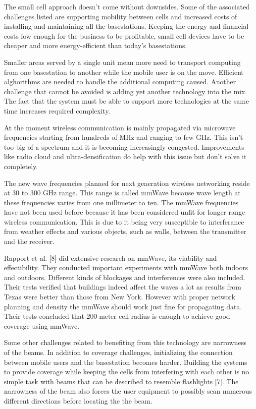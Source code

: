 \documentclass[conference]{IEEEtran}
\begin{document}
\par
The small cell approach doesn't come without downsides. Some of the associated challenges listed are supporting mobility between cells and increased costs of installing and maintaining all the basestations. Keeping the energy and financial costs low enough for the business to be profitable, small cell devices have to be cheaper and more energy-efficient than today's basestations.
\par
Smaller areas served by a single unit mean more need to transport computing from one basestation to another while the mobile user is on the move. Efficient alghorithms are needed to handle the additional computing caused. Another challenge that cannot be avoided is adding yet another technology into the mix. The fact that the system must be able to support more technologies at the same time increases required complexity.
\par
At the moment wireless communication is mainly propagated via microwave frequencies starting from hundreds of MHz and ranging to few GHz. This isn't too big of a spectrum and it is becoming increasingly congested. Improvements like radio cloud and ultra-densification do help with this issue but don't solve it completely.
\par
The new wave frequencies planned for next generation wireless networking reside at 30 to 300 GHz range. This range is called mmWave because wave length at these frequencies varies from one millimeter to ten. The mmWave frequencies have not been used before because it has been considered unfit for longer range wireless communication. This is due to it being very susceptible to interferance from weather effects and various objects, such as walls, between the transmitter and the receiver.
\par
Rapport et al. [8] did extensive research on mmWave, its viability and effectibility. They conducted important experiments with mmWave both indoors and outdoors. Different kinds of blockages and interferences were also included. Their tests verified that buildings indeed affect the waves a lot as results from Texas were better than those from New York. However with proper network planning and density the mmWave should work just fine for propagating data. Their tests concluded that 200 meter cell radius is enough to achieve good coverage using mmWave.
\par
Some other challenges related to benefiting from this technology are narrowness of the beams. In addition to coverage challenges, initializing the connection between mobile users and the basestation becomes harder. Building the systems to provide coverage while keeping the cells from interfering with each other is no simple task with beams that can be described to resemble flashlights [7]. The narrowness of the beam also forces the user equipment to possibly scan numerous different directions before locating the the beam.
\end{document}
